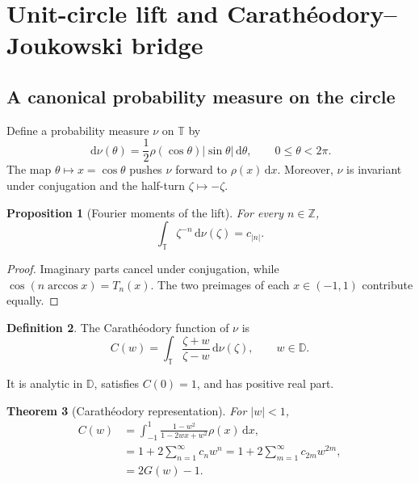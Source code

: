 \documentclass[11pt,oneside]{article}
\newtheorem{theorem}{Theorem}[section]
\newtheorem{proposition}[theorem]{Proposition}
\theoremstyle{definition}
\newtheorem{definition}[theorem]{Definition}
\newcommand{\dd}{\,\mathrm d}
\newcommand{\Z}{\mathbb Z}
\newcommand{\D}{\mathbb D}
\newcommand{\T}{\mathbb T}
\begin{document}
\section{Unit-circle lift and Carath\'eodory--Joukowski bridge}
\label{sec:circle}

\subsection{A canonical probability measure on the circle}

Define a probability measure \(\nu\) on \(\T\) by
\begin{equation}
 \dd\nu(\theta)=\frac12\rho(\cos\theta)|\sin\theta|\dd\theta,
 \qquad 0\le\theta<2\pi.
 \label{eq:circle-lift}
\end{equation}
The map \(\theta\mapsto x=\cos\theta\) pushes \(\nu\) forward to \(\rho(x)\dd x\). Moreover,
\(\nu\) is invariant under conjugation and the half-turn \(\zeta\mapsto-\zeta\).

\begin{proposition}[Fourier moments of the lift]
\label{prop:circle-moments}
For every \(n\in\Z\),
\begin{equation}
 \int_{\T}\zeta^{-n}\dd\nu(\zeta)=c_{|n|}.
 \label{eq:nu-moments}
\end{equation}
\end{proposition}

\begin{proof}
Imaginary parts cancel under conjugation, while
\(\cos(n\arccos x)=T_n(x)\). The two preimages of each \(x\in(-1,1)\) contribute equally.
\end{proof}

\begin{definition}
The Carath\'eodory function of \(\nu\) is
\begin{equation}
 C(w)=\int_{\T}\frac{\zeta+w}{\zeta-w}\dd\nu(\zeta),
 \qquad w\in\D.
 \label{eq:C-def}
\end{equation}
\end{definition}
It is analytic in \(\D\), satisfies \(C(0)=1\), and has positive real part.

\begin{theorem}[Carath\'eodory representation]
\label{thm:C-representation}
For \(|w|<1\),
\begin{align}
 C(w)
 &=\int_{-1}^{1}\frac{1-w^2}{1-2wx+w^2}\rho(x)\dd x,
 \label{eq:C-real-integral}\\
 &=1+2\sum_{n=1}^{\infty}c_nw^n
 =1+2\sum_{m=1}^{\infty}c_{2m}w^{2m},
 \label{eq:C-series}\\
 &=2G(w)-1.
 \label{eq:C-G}
\end{align}
\end{theorem}
\end{document}
